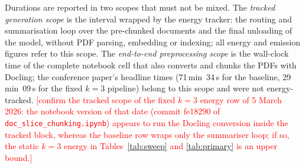 \documentclass[pdflatex,sn-mathphys-num]{sn-jnl}
\newcommand{\todo}[1]{\textcolor{red}{#1}}
\theoremstyle{thmstyleone}%
\theoremstyle{thmstylethree}%
\begin{document}
Durations are reported in two scopes that must not be mixed. The \emph{tracked generation scope} is the interval wrapped by the energy tracker: the routing and summarisation loop over the pre-chunked documents and the final unloading of the model, without PDF parsing, embedding or indexing; all energy and emission figures refer to this scope. The \emph{end-to-end preprocessing scope} is the wall-clock time of the complete notebook cell that also converts and chunks the PDFs with Docling; the conference paper's headline times (71\,min~34\,s for the baseline, 29\,min~09\,s for the fixed $k=3$ pipeline) belong to this scope and were not energy-tracked. \todo{[confirm the tracked scope of the fixed $k=3$ energy row of 5 March 2026: the notebook version of that date (commit fe18290 of \texttt{doc\_slice\_chunking.ipynb}) appears to run the Docling conversion inside the tracked block, whereas the baseline row wraps only the summariser loop; if so, the static $k=3$ energy in Tables~\ref{tab:sweep} and \ref{tab:primary} is an upper bound.]}
\end{document}

